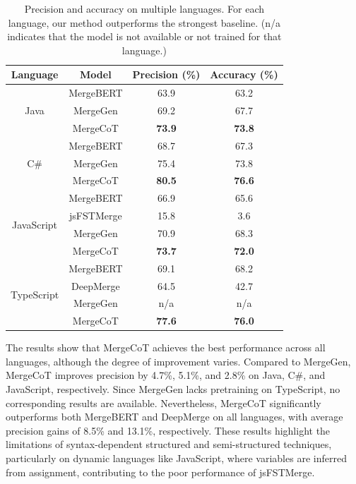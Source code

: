\documentclass[sigconf,review,anonymous]{acmart}
\begin{document}
\begin{table}[]
\caption{Precision and accuracy on multiple languages. For each language, our method outperforms the strongest baseline. (n/a indicates that the model is not available or not trained for that language.)}
\begin{tabular}{cccc}
\hline
Language          & Model & Precision (\%) & Accuracy (\%) \\ \hline
\multirow{3}{*}{Java}       & MergeBERT      & 63.9                    & 63.2                   \\
                            & MergeGen       & 69.2                    & 67.7                   \\
                            & MergeCoT       & \textbf{73.9}           & \textbf{73.8}          \\ \hline
\multirow{3}{*}{C\#}        & MergeBERT      & 68.7                    & 67.3                   \\
                            & MergeGen       & 75.4                    & 73.8                   \\
                            & MergeCoT       & \textbf{80.5}           & \textbf{76.6}          \\ \hline
\multirow{4}{*}{JavaScript} & MergeBERT      & 66.9                    & 65.6                   \\
                            & jsFSTMerge     & 15.8                    & 3.6                    \\
                            & MergeGen       & 70.9                    & 68.3                   \\
                            & MergeCoT       & \textbf{73.7}           & \textbf{72.0}          \\ \hline
\multirow{4}{*}{TypeScript} & MergeBERT      & 69.1                    & 68.2                   \\
                            & DeepMerge      & 64.5                    & 42.7                   \\
                            & MergeGen       & n/a                     & n/a                    \\
                            & MergeCoT       & \textbf{77.6}           & \textbf{76.0}          \\ \hline
\end{tabular}
\label{tab: mutil language results}
\end{table}

The results show that MergeCoT achieves the best performance across all languages, although the degree of improvement varies. Compared to MergeGen, MergeCoT improves precision by 4.7\%, 5.1\%, and 2.8\% on Java, C\#, and JavaScript, respectively. Since MergeGen lacks pretraining on TypeScript, no corresponding results are available. Nevertheless, MergeCoT significantly outperforms both MergeBERT and DeepMerge on all languages, with average precision gains of 8.5\% and 13.1\%, respectively. These results highlight the limitations of syntax-dependent structured and semi-structured techniques, particularly on dynamic languages like JavaScript, where variables are inferred from assignment, contributing to the poor performance of jsFSTMerge.
\end{document}
